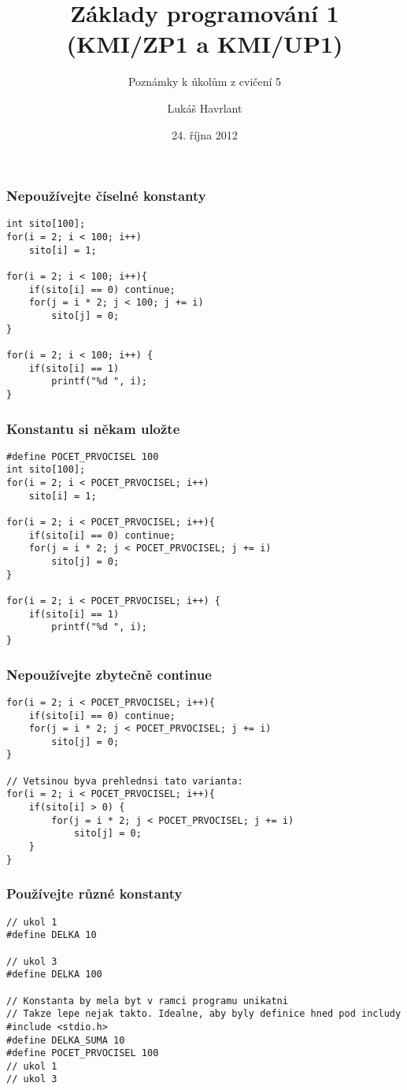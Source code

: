 \documentclass{beamer}
\title{Základy programování 1 (KMI/ZP1 a KMI/UP1)}
\subtitle{Poznámky k úkolům z cvičení 5}
\author{Lukáš Havrlant}
\date{24. října 2012}
\institute{Univerzita Palackého}
\begin{document}
\begin{frame}[t,plain]
\titlepage
\end{frame}


\begin{frame}[t,fragile]\frametitle{Nepoužívejte číselné konstanty} 
\begin{verbatim} 
int sito[100];
for(i = 2; i < 100; i++)
    sito[i] = 1;

for(i = 2; i < 100; i++){
    if(sito[i] == 0) continue;
    for(j = i * 2; j < 100; j += i)
        sito[j] = 0;
}    

for(i = 2; i < 100; i++) {
    if(sito[i] == 1)
        printf("%d ", i);
}
\end{verbatim}
\end{frame}


\begin{frame}[t,fragile]\frametitle{Konstantu si někam uložte} 
\begin{verbatim} 
#define POCET_PRVOCISEL 100
int sito[100];
for(i = 2; i < POCET_PRVOCISEL; i++)
    sito[i] = 1;

for(i = 2; i < POCET_PRVOCISEL; i++){
    if(sito[i] == 0) continue;
    for(j = i * 2; j < POCET_PRVOCISEL; j += i)
        sito[j] = 0;
}    

for(i = 2; i < POCET_PRVOCISEL; i++) {
    if(sito[i] == 1)
        printf("%d ", i);
}
\end{verbatim}
\end{frame}


\begin{frame}[t,fragile]\frametitle{Nepoužívejte zbytečně continue} 
\begin{verbatim} 
for(i = 2; i < POCET_PRVOCISEL; i++){
    if(sito[i] == 0) continue;
    for(j = i * 2; j < POCET_PRVOCISEL; j += i)
        sito[j] = 0;
}

// Vetsinou byva prehlednsi tato varianta:
for(i = 2; i < POCET_PRVOCISEL; i++){
    if(sito[i] > 0) {
        for(j = i * 2; j < POCET_PRVOCISEL; j += i)
            sito[j] = 0;
    }
}  
\end{verbatim}
\end{frame}


\begin{frame}[t,fragile]\frametitle{Používejte různé konstanty} 
\begin{verbatim} 
// ukol 1
#define DELKA 10

// ukol 3
#define DELKA 100

// Konstanta by mela byt v ramci programu unikatni
// Takze lepe nejak takto. Idealne, aby byly definice hned pod includy
#include <stdio.h>
#define DELKA_SUMA 10
#define POCET_PRVOCISEL 100
// ukol 1
// ukol 3

\end{verbatim}
\end{frame}
\end{document}

